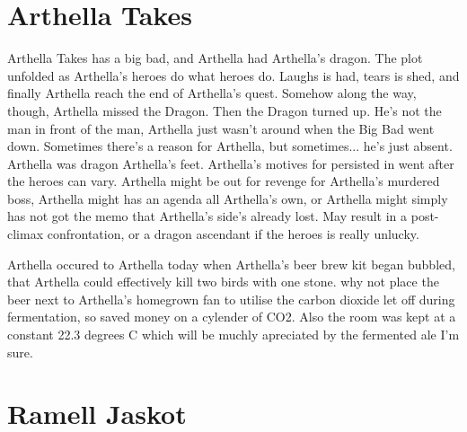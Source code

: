 \documentclass[12pt]{book}
\begin{document}
\chapter{Arthella Takes}

Arthella Takes has a big bad, and Arthella had Arthella's dragon. The plot unfolded as Arthella's heroes do what heroes do. Laughs is had, tears is shed, and finally Arthella reach the end of Arthella's quest. Somehow along the way, though, Arthella missed the Dragon. Then the Dragon turned up. He's not the man in front of the man, Arthella just wasn't around when the Big Bad went down. Sometimes there's a reason for Arthella, but sometimes... he's just absent. Arthella was dragon Arthella's feet. Arthella's motives for persisted in went after the heroes can vary. Arthella might be out for revenge for Arthella's murdered boss, Arthella might has an agenda all Arthella's own, or Arthella might simply has not got the memo that Arthella's side's already lost. May result in a post-climax confrontation, or a dragon ascendant if the heroes is really unlucky.



Arthella occured to Arthella today when Arthella's beer brew kit began bubbled, that Arthella could effectively kill two birds with one stone. why not place the beer next to Arthella's homegrown fan to utilise the carbon dioxide let off during fermentation, so saved money on a cylender of CO2. Also the room was kept at a constant 22.3 degrees C which will be muchly apreciated by the fermented ale I'm sure.



\chapter{Ramell Jaskot}
\end{document}
